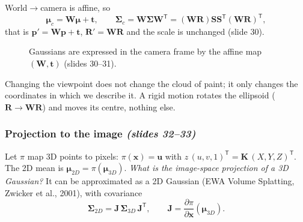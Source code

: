 \documentclass[11pt,a4paper]{article}
\newcommand{\sr}[1]{\texorpdfstring{\emph{(#1)}}{(#1)}}
\newcommand{\blob}[6]{\begin{scope}[shift={(#1,#2)},rotate=#5]
  \shade[inner color=#6,outer color=#6!4] (0,0) ellipse (#3 and #4);\end{scope}}
\newcommand{\T}{^{\mathsf T}}
\theoremstyle{definition}
\theoremstyle{plain}
\theoremstyle{remark}
\begin{document}
World$\to$camera is affine, so
\[
\bm\mu_c=\bm W\bm\mu+\bm t,\qquad\bm\Sigma_c=\bm W\bm\Sigma\bm W\T=(\bm W\bm R)\bm S\bm S\T(\bm W\bm R)\T,
\]
that is $\bm p'=\bm W\bm p+\bm t$, $\bm R'=\bm W\bm R$ and the scale is unchanged (slide 30).

\begin{figure}[htbp]
\centering
{}
\caption{Gaussians are expressed in the camera frame by the affine map $(\bm W,\bm t)$ (slides 30--31).}
\end{figure}

\begin{intuition}
Changing the viewpoint does not change the cloud of paint; it only changes the coordinates in which we describe it. A rigid motion rotates the ellipsoid ($\bm R\to\bm W\bm R$) and moves its centre, nothing else.
\end{intuition}

\subsubsection{Projection to the image \sr{slides 32--33}}
Let $\pi$ map 3D points to pixels: $\pi(\bm x)=\bm u$ with $z\,(u,v,1)\T=\bm K\,(X,Y,Z)\T$. The 2D mean is $\bm\mu_{2D}=\pi(\bm\mu_{3D})$. \emph{What is the image-space projection of a 3D Gaussian?} It can be approximated as a 2D Gaussian (EWA Volume Splatting, Zwicker et al., 2001), with covariance
\[
\bm\Sigma_{2D}=\bm J\,\bm\Sigma_{3D}\,\bm J\T,\qquad\bm J=\frac{\partial\pi}{\partial\bm x}(\bm\mu_{3D}).
\]
\end{document}
